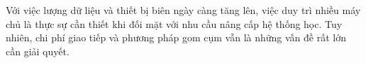 Với việc lượng dữ liệu và thiết bị biên ngày càng tăng lên, việc duy trì nhiều máy chủ là thực sự cần thiết khi đối mặt với nhu cầu nâng cấp hệ thống học. Tuy nhiên, chi phí giao tiếp và phương pháp gom cụm vẫn là những vấn đề rất lớn cần giải quyết.


